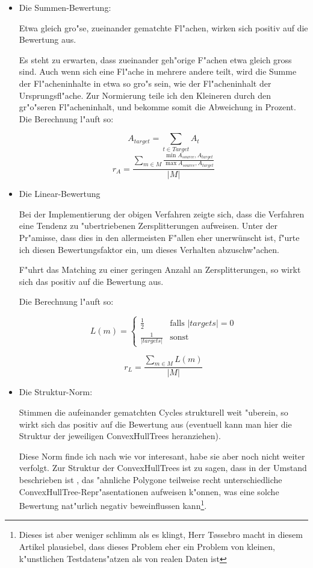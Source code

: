 \begin{itemize}
\item Die Summen-Bewertung:


Etwa gleich gro"se, zueinander gematchte Fl"achen, wirken sich positiv auf die Bewertung aus.

Es steht zu erwarten, dass zueinander geh"orige F"achen etwa gleich gross sind. Auch wenn sich eine Fl"ache in mehrere andere teilt, wird die Summe der Fl"acheninhalte in etwa so gro"s sein, wie der Fl"acheninhalt der Ursprungsfl"ache. Zur Normierung teile ich den Kleineren durch den gr"o"seren Fl"acheninhalt, und bekomme somit die Abweichung in Prozent. Die Berechnung l"auft so:

$$A_{target}=\sum_{t\in Target}A_t$$
$$r_A=\frac {\sum_{m\in M}\frac{\min{A_{source},A_{target}}}{\max{A_{source},A_{target}}}}{|M|}$$



\item Die Linear-Bewertung

Bei der Implementierung der obigen Verfahren zeigte sich, dass die Verfahren eine Tendenz zu "ubertriebenen Zersplitterungen aufweisen. Unter der Pr"amisse, dass dies in den allermeisten F"allen eher unerwünscht ist, f"urte ich diesen Bewertungsfaktor ein, um dieses Verhalten abzuschw"achen.

F"uhrt das Matching zu einer geringen Anzahl an Zersplitterungen, so wirkt sich das positiv auf die Bewertung aus.

Die Berechnung l"auft so:

$$L(m)=
\begin{cases}
	\frac{1}{2} & \text{falls }|targets|=0\\
	\frac{1}{|targets|} & \text{sonst}
    \end{cases}
$$

$$r_L=\frac{\sum_{m\in M}L(m)}{|M|}$$

\item Die Struktur-Norm:

Stimmen die aufeinander gematchten Cycles strukturell weit "uberein, so wirkt sich das positiv auf die Bewertung aus (eventuell kann man hier die Struktur der jeweiligen ConvexHullTrees heranziehen).

Diese Norm finde ich nach wie vor interesant, habe sie aber noch nicht weiter verfolgt. Zur Struktur der ConvexHullTrees ist zu sagen, dass in \cite{TG} der Umstand beschrieben ist , das "ahnliche Polygone teilweise recht unterschiedliche ConvexHullTree-Repr"asentationen aufweisen k"onnen, was eine solche Bewertung nat"urlich negativ beweinflussen kann\footnote{Dieses ist aber weniger schlimm als es klingt, Herr T\o{}ssebro macht in diesem Artikel plausiebel, dass dieses Problem eher ein Problem von kleinen, k"unstlichen Testdatens"atzen als von realen Daten ist}.


\end{itemize} 

